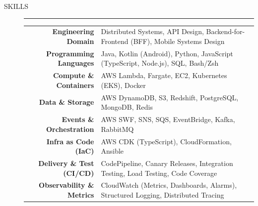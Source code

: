 \documentclass[11pt]{article}
\newcommand{\sectionlabel}[1]{\textsf{\fontfamily{ptm}\selectfont #1}}
\newcommand{\resumesection}[1]{%
    \item[\sectionlabel{#1}]%
    \hfill
    \par\nobreak\nointerlineskip
    \vspace{2pt}
    \noindent\rule{\linewidth}{1.0pt}\par
    \smallskip
}
\begin{document}
\begin{description}
    \resumesection{SKILLS}
        \par
        \noindent
        \begin{tabularx}{\linewidth}{@{}r|X}
            \textbf{Engineering Domain} & Distributed Systems, API Design, Backend-for-Frontend (BFF), Mobile Systems Design\\
            \textbf{Programming Languages} & Java, Kotlin (Android), Python, JavaScript (TypeScript, Node.js), SQL, Bash/Zsh \\
            \textbf{Compute \& Containers} & AWS Lambda, Fargate, EC2, Kubernetes (EKS), Docker \\
            \textbf{Data \& Storage} & AWS DynamoDB, S3, Redshift, PostgreSQL, MongoDB, Redis\\
            \textbf{Events \& Orchestration} & AWS SWF, SNS, SQS, EventBridge, Kafka, RabbitMQ\\
            \textbf{Infra as Code (IaC)} & AWS CDK (TypeScript), CloudFormation, Ansible\\
            \textbf{Delivery \& Test (CI/CD)} & CodePipeline, Canary Releases, Integration Testing, Load Testing, Code Coverage\\
            \textbf{Observability \& Metrics} & CloudWatch (Metrics, Dashboards, Alarms), Structured Logging, Distributed Tracing \\
        \end{tabularx}

\end{description}
\end{document}

